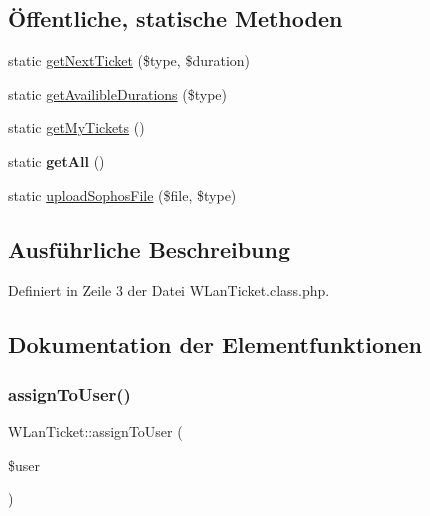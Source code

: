 \subsection*{Öffentliche, statische Methoden}
\begin{DoxyCompactItemize}
\item 
static \mbox{\hyperlink{class_w_lan_ticket_ab88007051a1afadc33b1c824184e951f}{get\+Next\+Ticket}} (\$type, \$duration)
\item 
static \mbox{\hyperlink{class_w_lan_ticket_af146240174a59a62da556497833675e3}{get\+Availible\+Durations}} (\$type)
\item 
static \mbox{\hyperlink{class_w_lan_ticket_a4a2aa35fac41f07ef29442c53369b74e}{get\+My\+Tickets}} ()
\item 
\mbox{\label{class_w_lan_ticket_a4b612c2cd60df25c9c06cce71477aaa7}} 
static {\bfseries get\+All} ()
\item 
static \mbox{\hyperlink{class_w_lan_ticket_ab3324b8a21eaaa793b654dffbcc932c0}{upload\+Sophos\+File}} (\$file, \$type)
\end{DoxyCompactItemize}


\subsection{Ausführliche Beschreibung}


Definiert in Zeile 3 der Datei W\+Lan\+Ticket.\+class.\+php.



\subsection{Dokumentation der Elementfunktionen}
\mbox{\label{class_w_lan_ticket_ab59b1428f1f1d99e28f5b0244dd5063b}} 
\subsubsection{\texorpdfstring{assign\+To\+User()}{assignToUser()}}
{\footnotesize\ttfamily W\+Lan\+Ticket\+::assign\+To\+User (\begin{DoxyParamCaption}\item[{}]{\$user }\end{DoxyParamCaption})}


